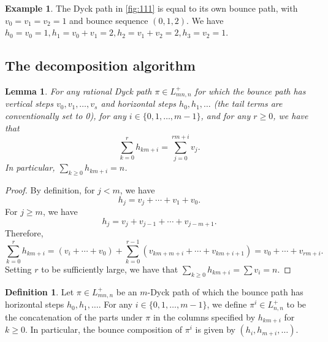 \documentclass[12pt,reqno]{amsart}
\newtheorem{lem}{Lemma}
\theoremstyle{definition}
\newtheorem{definition}{Definition}
\newtheorem{example}{Example}
\begin{document}
\begin{example}\label{ex:111}
The Dyck path in \cref{fig:111} is equal to its own bounce path, with $v_0 = v_1 = v_2 = 1$ and bounce sequence $(0,1,2)$. We have $h_0 = v_0 = 1, h_1 = v_0 + v_1 = 2, h_2 = v_1 + v_2 = 2, h_3 = v_2 = 1$.
\end{example}

\subsection{The decomposition algorithm}

\begin{lem}\label{lem:hv}
For any rational Dyck path $\pi \in L_{mn,n}^+$ for which the bounce path has vertical steps $v_0,v_1,\dots,v_{s}$ and horizontal steps $h_0,h_1,\dots$ (the tail terms are conventionally set to 0), for any $i \in \{0,1,\dots,m-1\}$, and for any $r \geq 0$, we have that
\begin{equation}
\sum_{k = 0}^{r} h_{km+i} = \sum_{j=0}^{rm+i} v_j.
\end{equation}
In particular, $\sum_{k \geq 0} h_{km+i} = n$.
\end{lem}
\begin{proof}
By definition, for $j < m$, we have 
\[h_j = v_j+\cdots+v_1+v_0.\]
For $j \geq m$, we have
\[
  h_j = v_j + v_{j-1} + \cdots + v_{j-m+1}.
\]
Therefore, 
\begin{equation}
  \sum_{k=0}^r h_{km+i} = (v_i + \cdots + v_0) + \sum_{k=0}^{r-1} (v_{km+m+i}+\cdots+v_{km+i+1}) = v_0 + \cdots + v_{rm+i}.
\end{equation}
Setting $r$ to be sufficiently large, we have that $\sum_{k\geq 0} h_{km+i} = \sum v_i = n$. 
\end{proof}

\begin{definition}\label{def:decom}
Let $\pi \in L_{mn,n}^+$ be an $m$-Dyck path of which the bounce path has horizontal steps $h_0,h_1,\dots$.
For any $i \in \{0,1,\dots,m-1\}$, we define $\pi^i \in L_{n,n}^+$ to be the concatenation of the parts under $\pi$ in the columns specified by $h_{km+i}$ for $k\geq 0$.
In particular, the bounce composition of $\pi^i$ is given by $(h_i,h_{m+i},\dots)$.
\end{definition}
\end{document}
